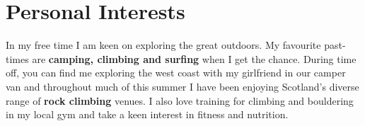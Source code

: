 \documentclass[]{cv-style}     %
\begin{document}
\begin{minipage}[b]{1.4\textwidth}
\begin{entrylist}
{}
\end{entrylist}
  \vspace{0.2cm}
\end{minipage}
\hspace*{-5.5cm}\begin{minipage}[b]{1.4\textwidth}
\section{Personal Interests}
  \vspace{0.2cm}
In my free time I am keen on exploring the great outdoors. My favourite past-times are \textbf{camping, climbing and surfing} when I get the chance. During time off, you can find me exploring the west coast with my girlfriend in our camper van and throughout much of this summer I have been enjoying Scotland's diverse range of \textbf{rock climbing} venues. I also love training for climbing and bouldering in my local gym and take a keen interest in fitness and nutrition.

\end{minipage}
\end{document}
